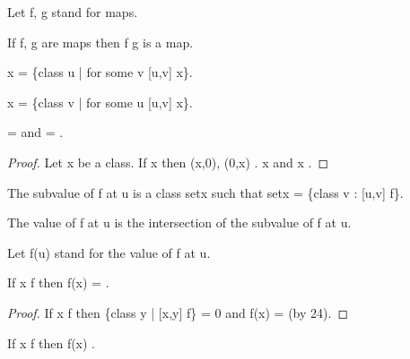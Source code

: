 \documentclass[a4paper,draft]{amsproc}
\begin{document}
\begin{forthel}
Let f, g stand for maps.

\begin{theorem}[64]
If f, g are maps then f \circ g is a map.
\end{theorem}

\begin{definition}[65]
\domain x = \{class u | for some v [u,v] \in x\}.
\end{definition}

\begin{definition}[66]
\range x = \{class v | for some u [u,v] \in x\}.
\end{definition}

\begin{theorem}[67]
\domain {} =  and \range {} = .
\end{theorem}
\begin{proof}
Let x be a class.
If x \in {} then (x,0), (0,x) \in {}.
x \in \domain {} and x \in \range {}.
\end{proof}

\begin{definition}
The subvalue of f at u is a class setx such that setx = \{class v : [u,v] \in f\}.
\end{definition}

\begin{signature}[68]
The value of f at u is the intersection of the subvalue of f at u.
\end{signature}
Let f(u) stand for the value of f at u.


\begin{theorem}[69a]
If x \notin \domain f then f(x) = .
\end{theorem}
\begin{proof}
If x \notin \domain f 
then \{class y | [x,y] \in f\} = 0 and f(x) =  (by 24).
\end{proof}

\begin{theorem}[69b]
If x \in \domain f then f(x) \in {}.
\end{theorem}


\end{forthel}
\end{document}

